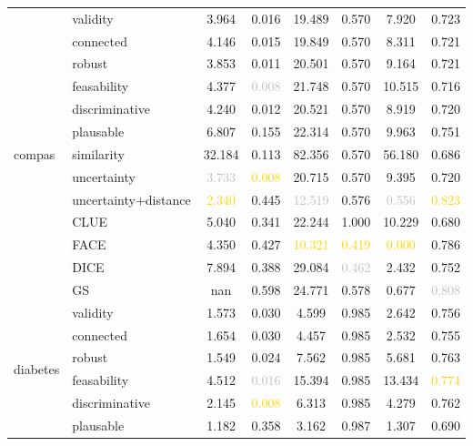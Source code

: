 \begin{table}[ht]
\begin{tabular}{l l c c c c c c}
\hline
\multirow{13}{*}{compas} & validity & 3.964 & 0.016 & \textcolor{bronze}{19.489} & \textcolor{bronze}{0.570} & 7.920 & 0.723 \\
 & connected & 4.146 & 0.015 & 19.849 & \textcolor{bronze}{0.570} & 8.311 & 0.721 \\
 & robust & \textcolor{bronze}{3.853} & \textcolor{bronze}{0.011} & 20.501 & \textcolor{bronze}{0.570} & 9.164 & 0.721 \\
 & feasability & 4.377 & \textcolor{silver}{0.008} & 21.748 & \textcolor{bronze}{0.570} & 10.515 & 0.716 \\
 & discriminative & 4.240 & 0.012 & 20.521 & \textcolor{bronze}{0.570} & 8.919 & 0.720 \\
 & plausable & 6.807 & 0.155 & 22.314 & \textcolor{bronze}{0.570} & 9.963 & 0.751 \\
 & similarity & 32.184 & 0.113 & 82.356 & 0.570 & 56.180 & 0.686 \\
 & uncertainty & \textcolor{silver}{3.733} & \textcolor{gold}{0.008} & 20.715 & \textcolor{bronze}{0.570} & 9.395 & 0.720 \\
 & uncertainty+distance & \textcolor{gold}{2.340} & 0.445 & \textcolor{silver}{12.519} & 0.576 & \textcolor{silver}{0.556} & \textcolor{gold}{0.823} \\
 & CLUE & 5.040 & 0.341 & 22.244 & 1.000 & 10.229 & 0.680 \\
 & FACE & 4.350 & 0.427 & \textcolor{gold}{10.321} & \textcolor{gold}{0.419} & \textcolor{gold}{0.000} & \textcolor{bronze}{0.786} \\
 & DICE & 7.894 & 0.388 & 29.084 & \textcolor{silver}{0.462} & 2.432 & 0.752 \\
 & GS & nan & 0.598 & 24.771 & 0.578 & \textcolor{bronze}{0.677} & \textcolor{silver}{0.808} \\
\hline
\multirow{13}{*}{diabetes} & validity & 1.573 & 0.030 & 4.599 & 0.985 & 2.642 & 0.756 \\
 & connected & 1.654 & 0.030 & 4.457 & 0.985 & 2.532 & 0.755 \\
 & robust & 1.549 & \textcolor{bronze}{0.024} & 7.562 & 0.985 & 5.681 & \textcolor{bronze}{0.763} \\
 & feasability & 4.512 & \textcolor{silver}{0.016} & 15.394 & 0.985 & 13.434 & \textcolor{gold}{0.774} \\
 & discriminative & 2.145 & \textcolor{gold}{0.008} & 6.313 & 0.985 & 4.279 & 0.762 \\
 & plausable & 1.182 & 0.358 & 3.162 & 0.987 & 1.307 & 0.690 \\

\end{tabular}
\end{table}
